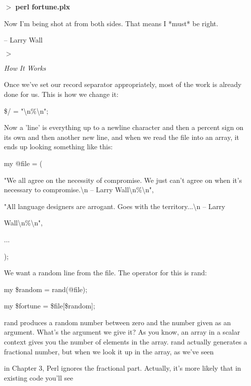 \documentclass[a4paper,11pt]{book}
\begin{document}
\noindent $>$ \textbf{perl fortune.plx}

\noindent Now I'm being shot at from both sides. That means I *must* be right.

\noindent -- Larry Wall

\noindent $>$

\noindent 

\noindent \textit{How It Works}

\noindent Once we've set our record separator appropriately, most of the work is already done for us. This is how we change it:

\noindent 

\noindent \$/ = "\textbackslash n\%\textbackslash n";

\noindent 

\noindent Now a 'line' is everything up to a newline character and then a percent sign on its own and then another new line, and when we read the file into an array, it ends up looking something like this:

\noindent 

\noindent my @file = (

"We all agree on the necessity of compromise.  We just can't agree on when it's necessary to compromise.\textbackslash n -- Larry Wall\textbackslash n\%\textbackslash n",

\noindent "All language designers are arrogant.  Goes with the territory...\textbackslash n -- Larry

\noindent Wall\textbackslash n\%\textbackslash n",

\noindent ...

\noindent );

\noindent 

\noindent We want a random line from the file. The operator for this is rand:

\noindent 

\noindent my \$random = rand(@file);

\noindent my \$fortune = \$file[\$random];

\noindent 

\noindent rand produces a random number between zero and the number given as an argument. What's the argument we give it? As you know, an array in a scalar context gives you the number of elements in the array. rand actually generates a fractional number, but when we look it up in the array, as we've seen

\noindent in Chapter 3, Perl ignores the fractional part. Actually, it's more likely that in existing code you'll see
\end{document}
